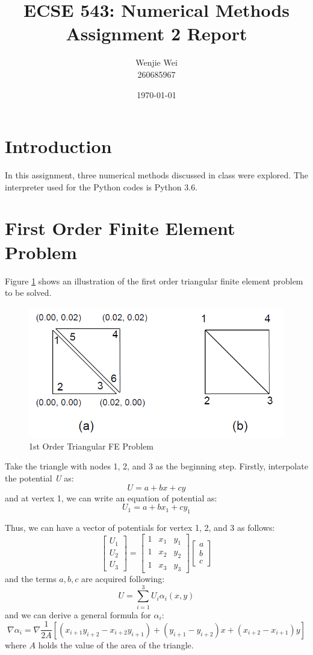 \documentclass[a4paper,titlepage]{article}
\title{\textbf{ECSE 543: Numerical Methods} \\ Assignment 2 Report}
\author{Wenjie Wei \\ 260685967}
\date{\today}
\begin{document}
	\sloppy
	\maketitle
	
	\tableofcontents
	\newpage
	
	\section*{Introduction}
		In this assignment, three numerical methods discussed in class were explored. The interpreter used for the Python codes is Python 3.6. 
		
	\section{First Order Finite Element Problem}
		Figure \ref{prob} shows an illustration of the first order triangular finite element problem to be solved. 
		\begin{figure}[!h]
			\centering
			\includegraphics[width=0.7\linewidth]{prob}
			\caption{1st Order Triangular FE Problem}
			\label{prob}
		\end{figure}
	
		Take the triangle with nodes 1, 2, and 3 as the beginning step. Firstly, interpolate the potential \textit{U} as:
		$$
			U = a + bx + cy
		$$
		and at vertex 1, we can write an equation of potential as:
		$$
			U_1 = a + bx_1 + cy_1
		$$
		
		Thus, we can have a vector of potentials for vertex 1, 2, and 3 as follows:
		$$
			\begin{bmatrix}
				U_1 \\ U_2 \\ U_3
			\end{bmatrix} = 
			\begin{bmatrix}
				1 & x_1 & y_1 \\
				1 & x_2 & y_2 \\
				1 & x_3 & y_3 
			\end{bmatrix}
			\begin{bmatrix}
				a \\ b \\ c
			\end{bmatrix}
		$$
		and the terms $a, b, c$ are acquired following:
		\begin{equation}
			U = \sum_{i = 1}^{3} U_i\alpha_i(x, y)
		\end{equation}
		and we can derive a general formula for $\alpha_i$:
		\begin{equation}
			\nabla \alpha_i = \nabla \frac{1}{2A}[(x_{i+1}y_{i+2}-x_{i+2}y_{i+1}) + (y_{i+1}-y_{i+2})x+(x_{i+2}-x_{i+1})y]			
		\end{equation}
		where $A$ holds the value of the area of the triangle.
		
\end{document}
